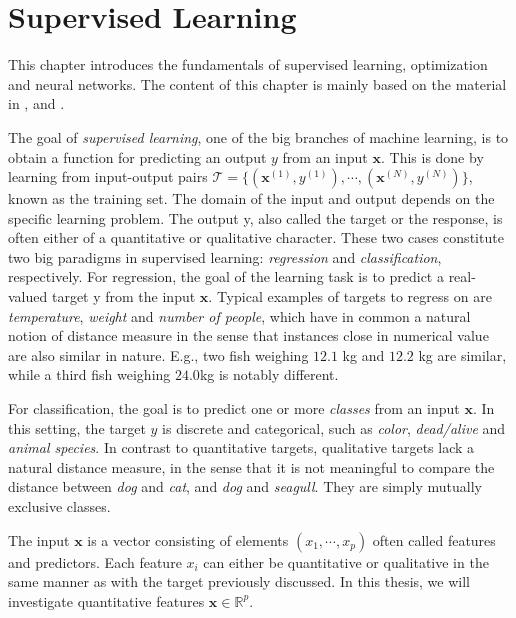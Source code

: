 \chapter{Supervised Learning}\label{chap:SupervisedLearning}

This chapter introduces the fundamentals of supervised learning, optimization and neural networks. The content of this chapter is mainly based on the material in \citet{SupervisedwquantumComputers}, \citet{hastie01statisticallearning} and \citet{nielsenneural}.

The goal of \emph{supervised learning}, one of the big branches of machine learning, is to obtain a function for predicting an output $y$ from an input $\boldsymbol{x}$. This is done by learning from input-output pairs $\mathcal{T} = \{(\boldsymbol{x}^{(1)}, y^{(1)}), \cdots, (\boldsymbol{x}^{(N)}, y^{(N)})\}$, known as the training set. The domain of the input and output depends on the specific learning problem. The output y, also called the target or the response, is often either of a quantitative or qualitative character. These two cases constitute two big paradigms in supervised learning: \emph{regression} and \emph{classification}, respectively. For regression, the goal of the learning task is to predict a real-valued target y from the input $\boldsymbol{x}$. Typical examples of targets to regress on are \emph{temperature}, \emph{weight} and \emph{number of people}, which have in common a natural notion of distance measure in the sense that instances close in numerical value are also similar in nature. E.g., two fish weighing $12.1$ kg and $12.2$ kg are similar, while a third fish weighing $24.0$kg is notably different.

For classification, the goal is to predict one or more \emph{classes} from an input $\boldsymbol{x}$. In this setting, the target $y$ is discrete and categorical, such as \emph{color}, \emph{dead/alive} and \emph{animal species}. In contrast to quantitative targets, qualitative targets lack a natural distance measure, in the sense that it is not meaningful to compare the distance between \emph{dog} and \emph{cat}, and \emph{dog} and \emph{seagull}. They are simply mutually exclusive classes.

The input $\boldsymbol{x}$ is a vector consisting of elements $(x_1, \cdots, x_p)$ often called features and predictors. Each feature $x_i$ can either be quantitative or qualitative in the same manner as with the target previously discussed. In this thesis, we will investigate quantitative features $\boldsymbol{x} \in \mathbb{R}^{p}$.


